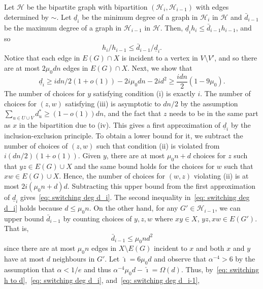 \documentclass[11pt]{article}
\theoremstyle{plain}
\begin{document}
        Let $\mathscr H$ be the bipartite graph with bipartition $(\mathcal H_i, \mathcal H_{i-1})$ with edges determined by $\sim$. Let $\underline{d}_i$ be the minimum degree of a graph in $\mathcal H_i$ in $\mathscr H$ and $\bar d_{i-1}$ be the maximum degree of a graph in $\mathcal H_{i-1}$ in $\mathscr H$. Then, $\underline{d}_ih_i \leq \bar d_{i-1}h_{i-1}$, and so 
        \begin{equation}\label{eq: switching h to d}
            h_i/h_{i-1} \leq \bar{d}_{i-1}/\underline{d}_i.
        \end{equation}
        Notice that each edge in $E(G) \cap X$ is incident to a vertex in $V \setminus V'$, and so there are at most $2\mu_0dn$ edges in $E(G) \cap X$. Next, we show that
        \begin{equation}\label{eq: switching deg d_i}
            \underline{d}_{i} \geq idn/2(1 + o(1)) - 2i\mu_0dn - 2id^2 \geq \frac{idn}{2}(1 - 9\mu_0).
        \end{equation}
The number of choices for $y$ satisfying condition (i) is exactly $i$. The number of choices for $(z,w)$ satisfying (iii) is asymptotic to $dn/2$ by the assumption $\sum_{u \in U \cup V}d^*_u \geq (1 - o(1))dn$, and the fact that $z$ needs to be in the same part as $x$ in the bipartition due to (iv). This gives a first approximation of $\underline{d}_i$ by the inclusion-exclusion principle. To obtain a lower bound for it, we subtract the number of choices of $(z,w)$ such that condition (ii) is violated from $i(dn/2)(1+o(1))$. Given $y$, there are at most $\mu_0 n+d$ choices for $z$ such that $yz\in E(G)\cup X$ and the same bound holds for the choices for $w$ such that $xw\in E(G)\cup X$. Hence, the number of choices for $(w,z)$ violating (ii) is at most $2i(\mu_0 n+d)d$. Subtracting this upper bound from the first approximation of $\underline{d}_i$ gives~\eqref{eq: switching deg d_i}. The second inequality in~\eqref{eq: switching deg d_i} holds because $d \leq \mu_0 n$. On the other hand, for any $G' \in \mathcal H_{i-1}$, we can upper bound $\bar d_{i-1}$ by counting choices of $y,z,w$ where $xy \in X$, $yz,xw \in E(G')$. That is,
        \begin{equation}\label{eq: switching deg d_i-1}
            \bar d_{i-1} \leq \mu_0nd^2
        \end{equation}
        since there are at most $\mu_0n$ edges in $X \setminus E(G)$ incident to $x$ and both $x$ and $y$ have at most $d$ neighbours in $G'$. 
        Let $\hat\imath=6\mu_0d$ and observe that $\alpha^{-4}>6$ by the assumption that $\alpha<1/e$ and thus $\alpha^{-4}\mu_0 d-\hat\imath=\Omega(d)$. Thus, by~\eqref{eq: switching h to d},~\eqref{eq: switching deg d_i}, and~\eqref{eq: switching deg d_i-1}, 
\end{document}
